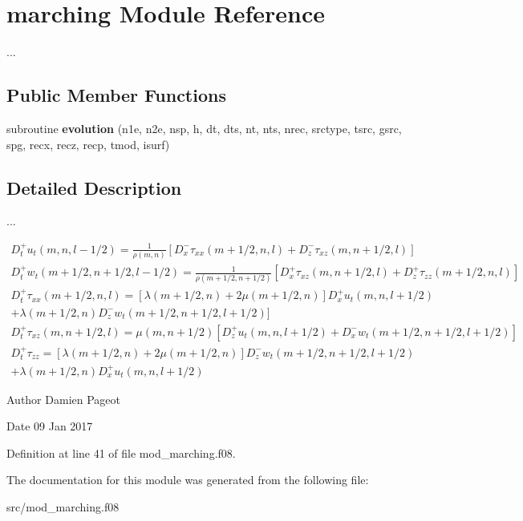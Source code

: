 \hypertarget{classmarching}{\section{marching Module Reference}
\label{classmarching}
}


...  


\subsection*{Public Member Functions}
\begin{DoxyCompactItemize}
\item 
\hypertarget{classmarching_a645dee4b9ec52a99feb262036258ea6a}{subroutine {\bfseries evolution} (n1e, n2e, nsp, h, dt, dts, nt, nts, nrec, srctype, tsrc, gsrc, spg, recx, recz, recp, tmod, isurf)}\label{classmarching_a645dee4b9ec52a99feb262036258ea6a}

\end{DoxyCompactItemize}


\subsection{Detailed Description}
... 

 
 \begin{small}
 \begin{eqnarray}
 D^{+}_{t}u_{t}(m,n,l-1/2) =\frac{1}{\rho(m,n)}[
 D^{-}_{x}\tau_{xx}(m+1/2,n,l) +
 D^{-}_{z}\tau_{xz}(m,n+1/2,l)]
 \\
 D^{+}_{t}w_{t}(m+1/2,n+1/2,l-1/2)=\frac{1}{\rho(m+1/2,n+1/2)}[
 D^{+}_{x}\tau_{xz}(m,n+1/2,l) +
 D^{+}_{z}\tau_{zz}(m+1/2,n,l)]
 \\
 D^{+}_{t}\tau_{xx}(m+1/2,n,l) = 
 [\lambda(m+1/2,n)+2\mu(m+1/2,n)]D^{+}_{x}u_{t}(m,n,l+1/2) \nonumber\\
 + \lambda(m+1/2,n)D^{-}_{z}w_{t}(m+1/2,n+1/2,l+1/2)]&
 \\
 D^{+}_{t}\tau_{xz}(m,n+1/2,l) = 
 \mu(m,n+1/2)[D^{+}_{z}u_{t}(m,n,l+1/2)+
 D^{-}_{x}w_{t}(m+1/2,n+1/2,l+1/2)]
 \\
 D^{+}_{t}\tau_{zz} = 
 [\lambda(m+1/2,n)+2\mu(m+1/2,n)]D^{-}_{z}w_{t}(m+1/2,n+1/2,l+1/2)\nonumber \\
 + \lambda(m+1/2,n)D^{+}_{x}u_{t}(m,n,l+1/2)&
 \end{eqnarray}
 \end{small}
 

\cite{levander1988fourth}

\begin{DoxyAuthor}{Author}
Damien Pageot 
\end{DoxyAuthor}
\begin{DoxyDate}{Date}
09 Jan 2017 
\end{DoxyDate}


Definition at line 41 of file mod\-\_\-marching.\-f08.



The documentation for this module was generated from the following file\-:\begin{DoxyCompactItemize}
\item 
src/mod\-\_\-marching.\-f08\end{DoxyCompactItemize}
